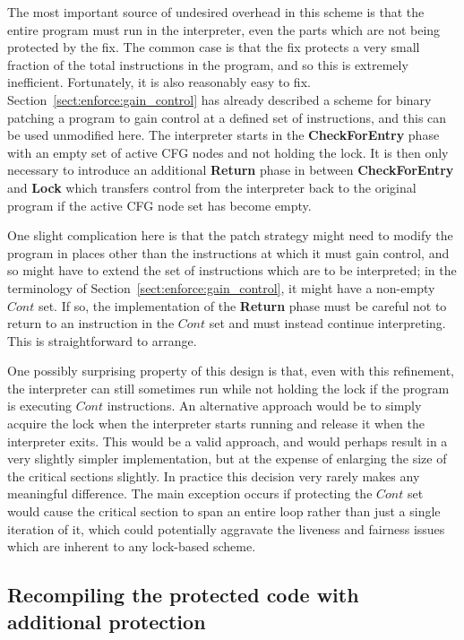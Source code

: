 The most important source of undesired overhead in this scheme is that
the entire program must run in the interpreter, even the parts which
are not being protected by the fix.  The common case is that the fix
protects a very small fraction of the total instructions in the
program, and so this is extremely inefficient.  Fortunately, it is
also reasonably easy to fix.  Section~\ref{sect:enforce:gain_control}
has already described a scheme for binary patching a program to gain
control at a defined set of instructions, and this can be used
unmodified here.  The interpreter starts in the \textbf{CheckForEntry}
phase with an empty set of active CFG nodes and not holding the lock.
It is then only necessary to introduce an additional \textbf{Return}
phase in between \textbf{CheckForEntry} and \textbf{Lock} which
transfers control from the interpreter back to the original program if
the active CFG node set has become empty.

One slight complication here is that the patch strategy might need to
modify the program in places other than the instructions at which it
must gain control, and so might have to extend the set of instructions
which are to be interpreted; in the terminology of
Section~\ref{sect:enforce:gain_control}, it might have a non-empty
$\mathit{Cont}$ set.  If so, the implementation of the \textbf{Return}
phase must be careful not to return to an instruction in the
$\mathit{Cont}$ set and must instead continue interpreting.  This is
straightforward to arrange.

One possibly surprising property of this design is that, even with
this refinement, the interpreter can still sometimes run while not
holding the lock if the program is executing $\mathit{Cont}$
instructions.  An alternative approach would be to simply acquire the
lock when the interpreter starts running and release it when the
interpreter exits.  This would be a valid approach, and would perhaps
result in a very slightly simpler implementation, but at the expense
of enlarging the size of the critical sections slightly.  In practice
this decision very rarely makes any meaningful difference.  The main
exception occurs if protecting the $\mathit{Cont}$ set would cause the
critical section to span an entire loop rather than just a single
iteration of it, which could potentially aggravate the liveness and
fairness issues which are inherent to any lock-based scheme.

\subsection{Recompiling the protected code with additional protection}

